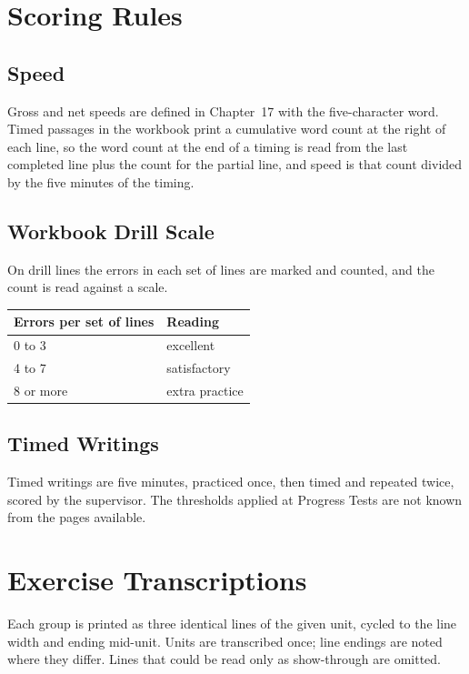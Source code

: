 \chapter{Scoring Rules}

\section{Speed}

Gross and net speeds are defined in Chapter~17 with the five-character word. Timed passages in the workbook print a cumulative word count at the right of each line, so the word count at the end of a timing is read from the last completed line plus the count for the partial line, and speed is that count divided by the five minutes of the timing.

\section{Workbook Drill Scale}

On drill lines the errors in each set of lines are marked and counted, and the count is read against a scale.

\begin{center}
\begin{tabular}{@{}ll@{}}
\toprule
Errors per set of lines & Reading \\
\midrule
0 to 3 & excellent \\
4 to 7 & satisfactory \\
8 or more & extra practice \\
\bottomrule
\end{tabular}
\end{center}

\section{Timed Writings}

Timed writings are five minutes, practiced once, then timed and repeated twice, scored by the supervisor. The thresholds applied at Progress Tests are not known from the pages available. 

\chapter{Exercise Transcriptions}

Each group is printed as three identical lines of the given unit, cycled to the line width and ending mid-unit. Units are transcribed once; line endings are noted where they differ. Lines that could be read only as show-through are omitted.

